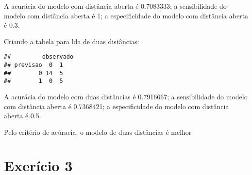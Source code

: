 \documentclass[
]{article}
\newenvironment{Shaded}{\begin{snugshade}}{\end{snugshade}}
\newcommand{\AttributeTok}[1]{\textcolor[rgb]{0.77,0.63,0.00}{#1}}
\newcommand{\DecValTok}[1]{\textcolor[rgb]{0.00,0.00,0.81}{#1}}
\newcommand{\FunctionTok}[1]{\textcolor[rgb]{0.00,0.00,0.00}{#1}}
\newcommand{\NormalTok}[1]{#1}
\newcommand{\OtherTok}[1]{\textcolor[rgb]{0.56,0.35,0.01}{#1}}
\newcommand{\SpecialCharTok}[1]{\textcolor[rgb]{0.00,0.00,0.00}{#1}}
\begin{document}
A acurácia do modelo com distância aberta é 0.7083333; a sensibilidade
do modelo com distância aberta é 1; a especificidade do modelo com
distância aberta é 0.3.

Criando a tabela para lda de duas distâncias:

\begin{Shaded}
\end{Shaded}

\begin{verbatim}
##         observado
## previsao  0  1
##        0 14  5
##        1  0  5
\end{verbatim}

A acurácia do modelo com duas distâncias é 0.7916667; a sensibilidade do
modelo com distância aberta é 0.7368421; a especificidade do modelo com
distância aberta é 0.5.

Pelo critério de acúracia, o modelo de duas distâncias é melhor

\hypertarget{exeruxedcio-3}{%
\section{Exerício 3}\label{exeruxedcio-3}}
\end{document}

